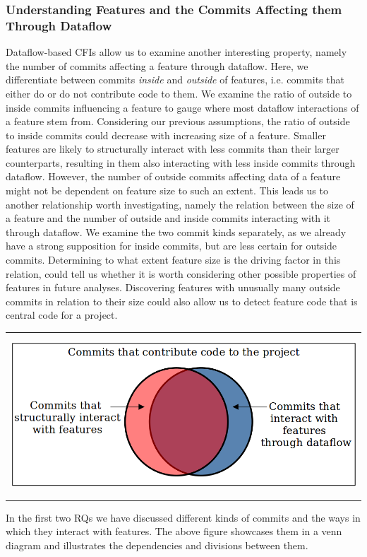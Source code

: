 \subsubsection*{Understanding Features and the Commits Affecting them Through Dataflow}

Dataflow-based CFIs allow us to examine another interesting property, namely the number of commits affecting a feature through dataflow.
Here, we differentiate between commits \emph{inside} and \emph{outside} of features, i.e. commits that either do or do not contribute code to them.
We examine the ratio of outside to inside commits influencing a feature to gauge where most dataflow interactions of a feature stem from.
Considering our previous assumptions, the ratio of outside to inside commits could decrease with increasing size of a feature.
Smaller features are likely to structurally interact with less commits than their larger counterparts, resulting in them also interacting with less inside commits through dataflow.
However, the number of outside commits affecting data of a feature might not be dependent on feature size to such an extent.
This leads us to another relationship worth investigating, namely the relation between the size of a feature and the number of outside and inside commits interacting with it through dataflow.
We examine the two commit kinds separately, as we already have a strong supposition for inside commits, but are less certain for outside commits. 
Determining to what extent feature size is the driving factor in this relation, could tell us whether it is worth considering other possible properties of features in future analyses.
Discovering features with unusually many outside commits in relation to their size could also allow us to detect feature code that is central code for a project.

\begin{center}
\begin{tabular}{c}
\includegraphics[height=6cm]{gfx/Commits-of-a-Software-Project.png}
\end{tabular}
\end{center}
In the first two RQs we have discussed different kinds of commits and the ways in which they interact with features. 
The above figure showcases them in a venn diagram and illustrates the dependencies and divisions between them.

